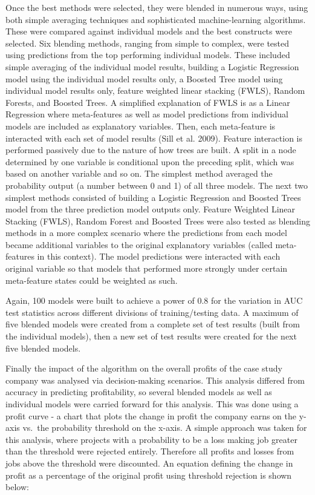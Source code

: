 \documentclass[]{elsarticle} %
\begin{document}
Once the best methods were selected, they were blended in numerous ways,
using both simple averaging techniques and sophisticated
machine-learning algorithms. These were compared against individual
models and the best constructs were selected. Six blending methods,
ranging from simple to complex, were tested using predictions from the
top performing individual models. These included simple averaging of the
individual model results, building a Logistic Regression model using the
individual model results only, a Boosted Tree model using individual
model results only, feature weighted linear stacking (FWLS), Random
Forests, and Boosted Trees. A simplified explanation of FWLS is as a
Linear Regression where meta-features as well as model predictions from
individual models are included as explanatory variables. Then, each
meta-feature is interacted with each set of model results (Sill et al.
2009). Feature interaction is performed passively due to the nature of
how trees are built. A split in a node determined by one variable is
conditional upon the preceding split, which was based on another
variable and so on. The simplest method averaged the probability output
(a number between 0 and 1) of all three models. The next two simplest
methods consisted of building a Logistic Regression and Boosted Trees
model from the three prediction model outputs only. Feature Weighted
Linear Stacking (FWLS), Random Forest and Boosted Trees were also tested
as blending methods in a more complex scenario where the predictions
from each model became additional variables to the original explanatory
variables (called meta-features in this context). The model predictions
were interacted with each original variable so that models that
performed more strongly under certain meta-feature states could be
weighted as such.

Again, 100 models were built to achieve a power of 0.8 for the variation
in AUC test statistics across different divisions of training/testing
data. A maximum of five blended models were created from a complete set
of test results (built from the individual models), then a new set of
test results were created for the next five blended models.

Finally the impact of the algorithm on the overall profits of the case
study company was analysed via decision-making scenarios. This analysis
differed from accuracy in predicting profitability, so several blended
models as well as individual models were carried forward for this
analysis. This was done using a profit curve - a chart that plots the
change in profit the company earns on the y-axis vs.~the probability
threshold on the x-axis. A simple approach was taken for this analysis,
where projects with a probability to be a loss making job greater than
the threshold were rejected entirely. Therefore all profits and losses
from jobs above the threshold were discounted. An equation defining the
change in profit as a percentage of the original profit using threshold
rejection is shown below:
\end{document}
